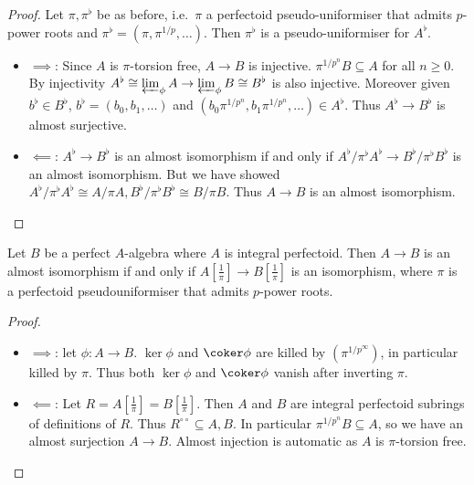 \documentclass[a4paper]{article}
\newcommand{\tilt}{\flat} %
\begin{document}
\begin{proof}
  Let \(\pi, \pi^\tilt\) be as before, i.e.\ \(\pi\) a perfectoid pseudo-uniformiser that admits \(p\)-power roots and \(\pi^\tilt = (\pi, \pi^{1/p}, \dots)\). Then \(\pi^\tilt\) is a pseudo-uniformiser for \(A^\tilt\).
  \begin{itemize}
  \item \(\implies\): Since \(A\) is \(\pi\)-torsion free, \(A \to B\) is injective. \(\pi^{1/p^n}B \subseteq A\) for all \(n \geq 0\). By injectivity \(A^\tilt \cong \varprojlim_\phi A \to \varprojlim_\phi B \cong B^\tilt\) is also injective. Moreover given \(b^\tilt \in B^\tilt\), \(b^\tilt = (b_0, b_1, \dots)\) and \((b_0 \pi^{1/p^n}, b_1 \pi^{1/p^n}, \dots) \in A^\tilt\). Thus \(A^\tilt \to B^\tilt\) is almost surjective.
  \item \(\impliedby\): \(A^\tilt \to B^\tilt\) is an almost isomorphism if and only if \(A^\tilt/\pi^\tilt A^\tilt \to B^\tilt/\pi^\tilt B^\tilt\) is an almost isomorphism. But we have showed \(A^\tilt/\pi^\tilt A^\tilt \cong A/\pi A, B^\tilt/\pi^\tilt B^\tilt \cong B/\pi B\). Thus \(A \to B\) is an almost isomorphism.
  \end{itemize}
\end{proof}

\begin{lemma}
Let \(B\) be a perfect \(A\)-algebra where \(A\) is integral perfectoid. Then \(A \to B\) is an almost isomorphism if and only if \(A[\frac{1}{\pi}] \to B[\frac{1}{\pi}]\) is an isomorphism, where \(\pi\) is a perfectoid pseudouniformiser that admits \(p\)-power roots.
\end{lemma}

\begin{proof}\leavevmode
  \begin{itemize}
  \item \(\implies\): let \(\phi: A \to B\). \(\ker \phi\) and \(\coker \phi\) are killed by \((\pi^{1/p^\infty})\), in particular killed by \(\pi\). Thus both \(\ker \phi\) and \(\coker \phi\) vanish after inverting \(\pi\).
  \item \(\impliedby\): Let \(R = A[\frac{1}{\pi}] = B[\frac{1}{\pi}]\). Then \(A\) and \(B\) are integral perfectoid subrings of definitions of \(R\). Thus \(R^{\circ \circ} \subseteq A, B\). In particular \(\pi^{1/p^n}B \subseteq A\), so we have an almost surjection \(A \to B\). Almost injection is automatic as \(A\) is \(\pi\)-torsion free.
  \end{itemize}
\end{proof}
\end{document}
